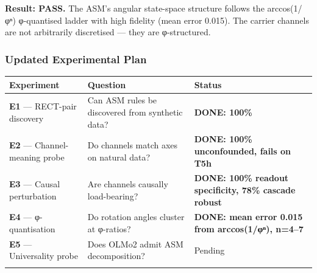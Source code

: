 \documentclass[
  twocolumn,
  10pt,
  a4paper]{article}
\newenvironment{tsxtable}{\begin{center}\footnotesize}{\end{center}}
\let\endhead\relax
\begin{document}
\textbf{Result: PASS.} The ASM's angular state-space structure follows
the arccos(1/φⁿ) φ-quantised ladder with high fidelity (mean error
0.015). The carrier channels are not arbitrarily discretised --- they
are φ-structured.

\hypertarget{updated-experimental-plan}{%
\subsubsection{Updated Experimental
Plan}\label{updated-experimental-plan}}

\begin{tsxtable}\begin{tabularx}{\linewidth}{@{}
  >{\raggedright\arraybackslash}p{}
  >{\raggedright\arraybackslash}p{}
  >{\raggedright\arraybackslash}p{}@{}}
\toprule\noalign{}
\begin{minipage}[b]{\linewidth}\raggedright
Experiment
\end{minipage} & \begin{minipage}[b]{\linewidth}\raggedright
Question
\end{minipage} & \begin{minipage}[b]{\linewidth}\raggedright
Status
\end{minipage} \\
\midrule\noalign{}
\endhead
\textbf{E1} --- RECT-pair discovery & Can ASM rules be discovered from
synthetic data? & \textbf{DONE: 100\%} \\
\textbf{E2} --- Channel-meaning probe & Do channels match axes on
natural data? & \textbf{DONE: 100\% unconfounded, fails on T5h} \\
\textbf{E3} --- Causal perturbation & Are channels causally
load-bearing? & \textbf{DONE: 100\% readout specificity, 78\% cascade
robust} \\
\textbf{E4} --- φ-quantisation & Do rotation angles cluster at φ-ratios?
& \textbf{DONE: mean error 0.015 from arccos(1/φⁿ), n=4--7} \\
\textbf{E5} --- Universality probe & Does OLMo2 admit ASM decomposition?
& Pending \\
\bottomrule\noalign{}
\end{tabularx}\end{tsxtable}
\end{document}
